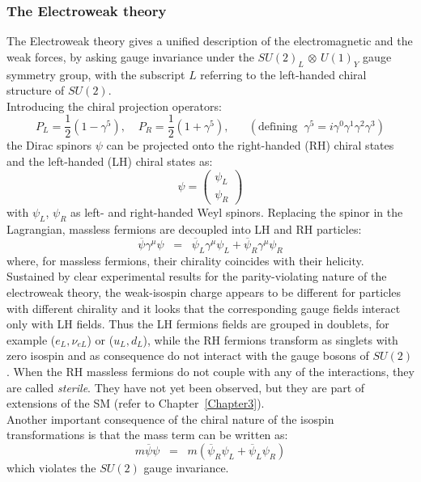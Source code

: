 \subsubsection{The Electroweak theory}\label{sec:ewk}
The Electroweak theory gives a unified description of the electromagnetic and the weak forces, by asking gauge invariance under the $SU(2)_{L}$ $\otimes$ $U(1)_{Y}$ gauge symmetry group, with the subscript $L$ referring to the left-handed chiral structure of $SU(2)$.\\
Introducing the chiral projection operators:
\begin{equation}
\label{eq:LRoperators}
P_L=\frac{1}{2} (1-\gamma^5), \;\;\;\ P_R=\frac{1}{2} (1+\gamma^5), \;\; \;\; \;\; (\text{defining} \;\; \gamma^5 = i\gamma^0\gamma^1\gamma^2\gamma^3)
\end{equation}
the Dirac spinors $\psi$ can be projected onto the right-handed (RH) chiral states and the left-handed (LH) chiral states as:
\begin{equation}
\label{eq:LR1}
\psi = \begin{pmatrix}
\psi_L\\
\psi_R
\end{pmatrix}
\end{equation}
with $\psi_L$, $\psi_R$ as left- and right-handed Weyl spinors. Replacing the spinor in the Lagrangian, massless fermions are decoupled into LH and RH particles:
\begin{equation}
\label{eq:LR2}
\overline{\psi} \gamma^{\mu} \psi \;\; = \;\; \overline{\psi}_L\gamma^{\mu} \psi_L +  \overline{\psi}_R\gamma^{\mu} \psi_R
\end{equation}
where, for massless fermions, their chirality coincides with their helicity. Sustained by clear experimental results for the parity-violating nature of the electroweak theory, the weak-isospin charge appears to be different for particles with different chirality and it looks that the corresponding gauge fields interact only with LH fields. Thus the LH fermions fields are grouped in doublets, for example ($e_L,\nu_{eL}$) or ($u_L,d_L$), while the RH fermions transform as singlets with zero isospin and as consequence do not interact with the gauge bosons of $SU(2)$. When the RH massless fermions do not couple with any of the interactions, they are called \emph{sterile}. They have not yet been observed, but they are part of extensions of the SM (refer to Chapter~\ref{Chapter3}).\\
Another important consequence of the chiral nature of the isospin transformations is that the mass term can be written as:
\begin{equation}
\label{eq:LR3}
m\overline{\psi} \psi \;\; = \;\; m(\overline{\psi}_R\psi_L +  \overline{\psi}_L\psi_R)
\end{equation}
which violates the $SU(2)$ gauge invariance. 

